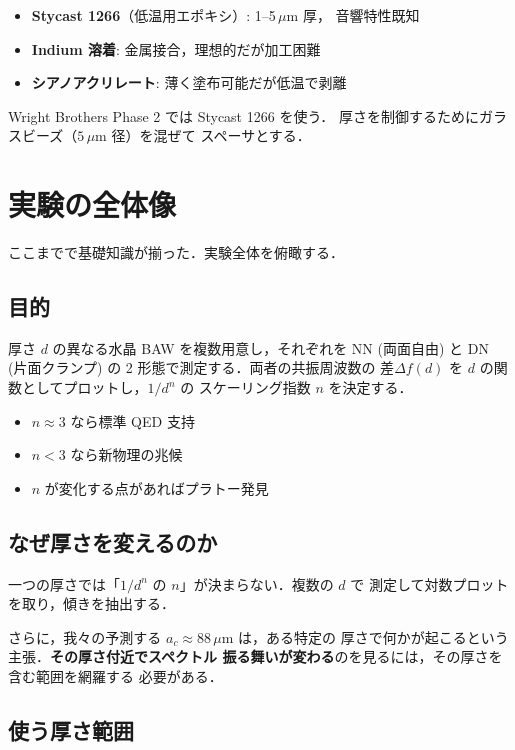 \documentclass[11pt,a4paper]{article}
\begin{document}
\begin{itemize}
\item \textbf{Stycast 1266}（低温用エポキシ）: 1--5\,$\mu$m 厚，
音響特性既知
\item \textbf{Indium 溶着}: 金属接合，理想的だが加工困難
\item \textbf{シアノアクリレート}: 薄く塗布可能だが低温で剥離
\end{itemize}

Wright Brothers Phase 2 では Stycast 1266 を使う．
厚さを制御するためにガラスビーズ（$5\,\mu$m 径）を混ぜて
スペーサとする．

\section{実験の全体像}

ここまでで基礎知識が揃った．実験全体を俯瞰する．

\subsection{目的}

厚さ $d$ の異なる水晶 BAW を複数用意し，それぞれを NN (両面自由)
と DN (片面クランプ) の 2 形態で測定する．両者の共振周波数の
差$\Delta f(d)$ を $d$ の関数としてプロットし，$1/d^n$ の
スケーリング指数 $n$ を決定する．

\begin{itemize}
\item $n \approx 3$ なら標準 QED 支持
\item $n < 3$ なら新物理の兆候
\item $n$ が変化する点があればプラトー発見
\end{itemize}

\subsection{なぜ厚さを変えるのか}

一つの厚さでは「$1/d^n$ の $n$」が決まらない．複数の $d$ で
測定して対数プロットを取り，傾きを抽出する．

さらに，我々の予測する $a_c \approx 88\,\mu$m は，ある特定の
厚さで何かが起こるという主張．\textbf{その厚さ付近でスペクトル
振る舞いが変わる}のを見るには，その厚さを含む範囲を網羅する
必要がある．

\subsection{使う厚さ範囲}
\end{document}
